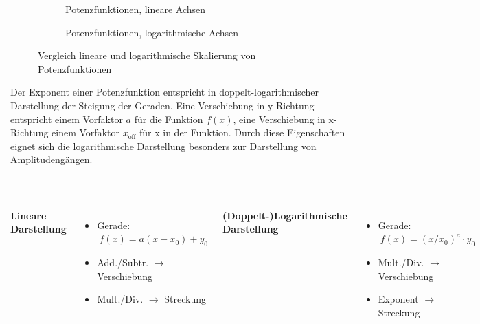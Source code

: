 \begin{frame}
{        \begin{figure}[H]
            \begin{subfigure}{0.48\textwidth}\centering
                \caption{Potenzfunktionen, lineare Achsen}
            \end{subfigure}%
            \begin{subfigure}{0.48\textwidth}\centering
                \caption{Potenzfunktionen, logarithmische Achsen}
            \end{subfigure}\hfill
            \caption{Vergleich lineare und logarithmische Skalierung von Potenzfunktionen}
            \label{fig:vgl:potenzfunktionen:lin:log}
        \end{figure}%
        Der Exponent einer Potenzfunktion entspricht in doppelt-logarithmischer Darstellung der Steigung der Geraden.
        Eine Verschiebung in y-Richtung entspricht einem Vorfaktor $a$ für die Funktion $f(x)$,
        eine Verschiebung in x-Richtung einem Vorfaktor $x_{\mathrm{off}}$ für x in der Funktion. 
        Durch diese Eigenschaften eignet sich die logarithmische Darstellung besonders zur Darstellung von Amplitudengängen.
    }%
    \b{
        \begin{columns}
                \centering \textbf{Lineare Darstellung}
                \begin{itemize}
                    \item Gerade: $\ f(x) = a \left(x-x_{0}\right) + y_{0}$
                    \item Add./Subtr. $\rightarrow$ Verschiebung %
                    \item Mult./Div. $\rightarrow$ Streckung%
                \end{itemize}
                \centering \textbf{(Doppelt-)Logarithmische Darstellung}
                \begin{itemize}
                    \item Gerade: $\ f(x) =  \left({x}/{x_{0}}\right)^{\displaystyle a} \cdot y_{0}$
                    \item Mult./Div. $\rightarrow$ Verschiebung
                    \item Exponent $\rightarrow$ Streckung
                \end{itemize}
        \end{columns}
    }
\end{frame}

